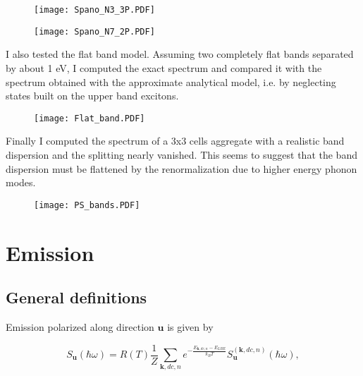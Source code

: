 \documentclass[pt12]{article}
\newcommand{\beq}{\begin{equation}}
\newcommand{\eeq}{\end{equation}}
\newcommand{\bfk}{\mathbf{k}}
\newcommand{\bfu}{\mathbf{u}}
\begin{document}
\begin{figure}
\begin{center}
  \texttt{[image: Spano\_N3\_3P.PDF]}
  \caption{}\label{Fig_Spano_N3_3P}
\end{center}
\end{figure}

\begin{figure}
\begin{center}
  \texttt{[image: Spano\_N7\_2P.PDF]}
  \caption{}\label{Fig_Spano_N7_2P}
\end{center}
\end{figure}

I also tested the flat band model. Assuming two completely flat
bands separated by about 1 eV, I computed the exact spectrum and
compared it with the spectrum obtained with the approximate
analytical model, i.e. by neglecting states built on the upper band
excitons.

\begin{figure}
\begin{center}
  \texttt{[image: Flat\_band.PDF]}
  \caption{}\label{Fig_Flat_band}
\end{center}
\end{figure}

Finally I computed the spectrum of a 3x3 cells aggregate with a
realistic band dispersion and the splitting nearly vanished. This
seems to suggest that the band dispersion must be flattened by the
renormalization due to higher energy phonon modes.

\begin{figure}
\begin{center}
  \texttt{[image: PS\_bands.PDF]}
  \caption{}\label{Fig_PS_bands}
\end{center}
\end{figure}

\section{Emission}

\subsection{General definitions}

Emission polarized along direction $\bfu$ is given by

\beq S_\bfu(\hbar\omega)=R(T)
\frac{1}{Z}\sum_{\bfk,dc,n}e^{-\frac{E_{\bfk,dc,n}-E_{LBE}}{k_BT}}
S_\bfu^{(\bfk,dc,n)}(\hbar\omega), \eeq
\end{document}
